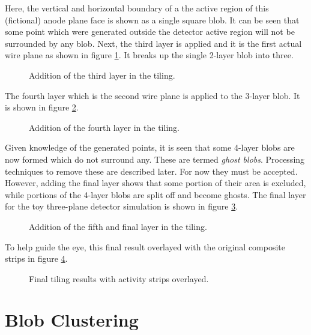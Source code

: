 \documentclass[11pt]{article}
\begin{document}
Here, the vertical and horizontal boundary of a the active region of this (fictional) anode plane face is shown as a single square blob.  It can be seen that some point which were generated outside the detector active region will not be surrounded by any blob.  Next, the third layer is applied and it is the first actual wire plane as shown in figure \ref{fig:blob3}.  It breaks up the single 2-layer blob into three.

\begin{figure}[htbp]
\centering

\caption{\label{fig:blob3}
Addition of the third layer in the tiling.}
\end{figure}

The fourth layer which is the second wire plane is applied to the 3-layer blob.  It is shown in figure \ref{fig:blob4}.

\begin{figure}[htbp]
\centering

\caption{\label{fig:blob4}
Addition of the fourth layer in the tiling.}
\end{figure}

Given knowledge of the generated points, it is seen that some 4-layer blobs are now formed which do not surround any.  These are termed \emph{ghost blobs}.  Processing techniques to remove these are described later.  For now they must be accepted.  However, adding the final layer shows that some portion of their area is excluded, while portions of the 4-layer blobs are split off and become ghosts.  The final layer for the toy three-plane detector simulation is shown in figure \ref{fig:blob5}.

\begin{figure}[htbp]
\centering

\caption{\label{fig:blob5}
Addition of the fifth and final layer in the tiling.}
\end{figure}

To help guide the eye, this final result overlayed with the original composite strips in figure \ref{fig:tiling}.

\begin{figure}[htbp]
\centering

\caption{\label{fig:tiling}
Final tiling results with activity strips overlayed.}
\end{figure}


\section{Blob Clustering}
\label{sec:clustering}
\end{document}
